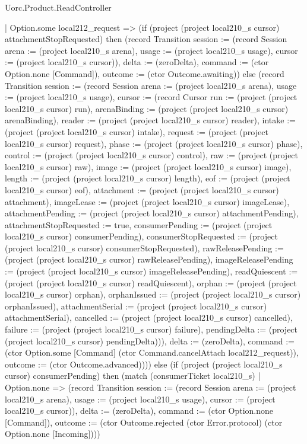 \begin{lexlean}{Uorc.Product.ReadController}
\begin{semanticmodule}
{    | Option.some local212_request => (if (project (project local210_s cursor) attachmentStopRequested) then (record Transition {session := (record Session {arena := (project local210_s arena), usage := (project local210_s usage), cursor := (project local210_s cursor)}), delta := (zeroDelta), command := (ctor Option.none [Command]), outcome := (ctor Outcome.awaiting)}) else (record Transition {session := (record Session {arena := (project local210_s arena), usage := (project local210_s usage), cursor := (record Cursor {run := (project (project local210_s cursor) run), arenaBinding := (project (project local210_s cursor) arenaBinding), reader := (project (project local210_s cursor) reader), intake := (project (project local210_s cursor) intake), request := (project (project local210_s cursor) request), phase := (project (project local210_s cursor) phase), control := (project (project local210_s cursor) control), raw := (project (project local210_s cursor) raw), image := (project (project local210_s cursor) image), length := (project (project local210_s cursor) length), eof := (project (project local210_s cursor) eof), attachment := (project (project local210_s cursor) attachment), imageLease := (project (project local210_s cursor) imageLease), attachmentPending := (project (project local210_s cursor) attachmentPending), attachmentStopRequested := true, consumerPending := (project (project local210_s cursor) consumerPending), consumerStopRequested := (project (project local210_s cursor) consumerStopRequested), rawReleasePending := (project (project local210_s cursor) rawReleasePending), imageReleasePending := (project (project local210_s cursor) imageReleasePending), readQuiescent := (project (project local210_s cursor) readQuiescent), orphan := (project (project local210_s cursor) orphan), orphanIssued := (project (project local210_s cursor) orphanIssued), attachmentSerial := (project (project local210_s cursor) attachmentSerial), cancelled := (project (project local210_s cursor) cancelled), failure := (project (project local210_s cursor) failure), pendingDelta := (project (project local210_s cursor) pendingDelta)})}), delta := (zeroDelta), command := (ctor Option.some [Command] (ctor Command.cancelAttach local212_request)), outcome := (ctor Outcome.advanced)}))) else (if (project (project local210_s cursor) consumerPending) then (match (consumerTicket local210_s)
    | Option.none => (record Transition {session := (record Session {arena := (project local210_s arena), usage := (project local210_s usage), cursor := (project local210_s cursor)}), delta := (zeroDelta), command := (ctor Option.none [Command]), outcome := (ctor Outcome.rejected (ctor Error.protocol) (ctor Option.none [Incoming]))})
}
\end{semanticmodule}
\end{lexlean}
